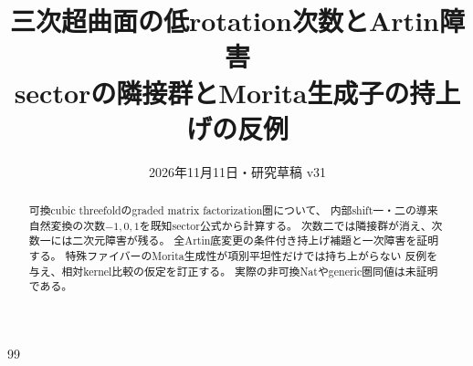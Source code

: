 
\title{三次超曲面の低rotation次数とArtin障害\\\large sectorの隣接群とMorita生成子の持上げの反例}
\author{}
\date{2026年11月11日・研究草稿 v31}

\maketitle
\begin{abstract}
可換cubic threefoldのgraded matrix factorization圏について、
内部shift一・二の導来自然変換の次数$-1,0,1$を既知sector公式から計算する。
次数二では隣接群が消え、次数一には二次元障害が残る。
全Artin底変更の条件付き持上げ補題と一次障害を証明する。
特殊ファイバーのMorita生成性が項別平坦性だけでは持ち上がらない
反例を与え、相対kernel比較の仮定を訂正する。
実際の非可換Natやgeneric圏同値は未証明である。
\end{abstract}

\begin{thebibliography}{99}

\end{thebibliography}

